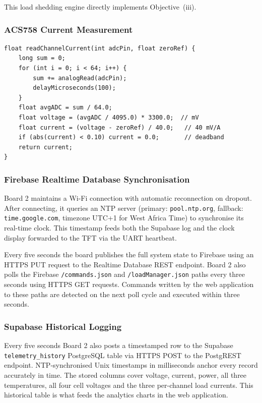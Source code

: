 \documentclass[12pt, a4paper]{report}
\begin{document}
{This load shedding engine directly implements Objective~(iii).
\vspace{1cm}
\subsubsection{ACS758 Current Measurement}

\begin{lstlisting}[language=CppESP, caption={ACS758 Current Calculation}, label={lst:acs758}]
float readChannelCurrent(int adcPin, float zeroRef) {
    long sum = 0;
    for (int i = 0; i < 64; i++) {
        sum += analogRead(adcPin);
        delayMicroseconds(100);
    }
    float avgADC = sum / 64.0;
    float voltage = (avgADC / 4095.0) * 3300.0;  // mV
    float current = (voltage - zeroRef) / 40.0;   // 40 mV/A
    if (abs(current) < 0.10) current = 0.0;       // deadband
    return current;
}
\end{lstlisting}

\subsubsection{Firebase Realtime Database Synchronisation}

Board 2 maintains a Wi-Fi connection with automatic reconnection on dropout.
After connecting, it queries an NTP server (primary: \texttt{pool.ntp.org},
fallback: \texttt{time.google.com}, timezone UTC+1 for West Africa Time) to
synchronise its real-time clock. This timestamp feeds both the Supabase log
and the clock display forwarded to the TFT via the UART heartbeat.

Every five seconds the board publishes the full system state to Firebase using
an HTTPS PUT request to the Realtime Database REST endpoint. Board 2 also polls
the Firebase \texttt{/commands.json} and \texttt{/loadManager.json} paths every
three seconds using HTTPS GET requests. Commands written by the web application
to these paths are detected on the next poll cycle and executed within three
seconds.

\subsubsection{Supabase Historical Logging}

Every five seconds Board 2 also posts a timestamped row to the Supabase
\texttt{telemetry\_history} PostgreSQL table via HTTPS POST to the PostgREST
endpoint. NTP-synchronised Unix timestamps in milliseconds anchor every record
accurately in time. The stored columns cover voltage, current, power, all
three temperatures, all four cell voltages and the three per-channel load
currents. This historical table is what feeds the analytics charts in the
web application.

}
\end{document}
